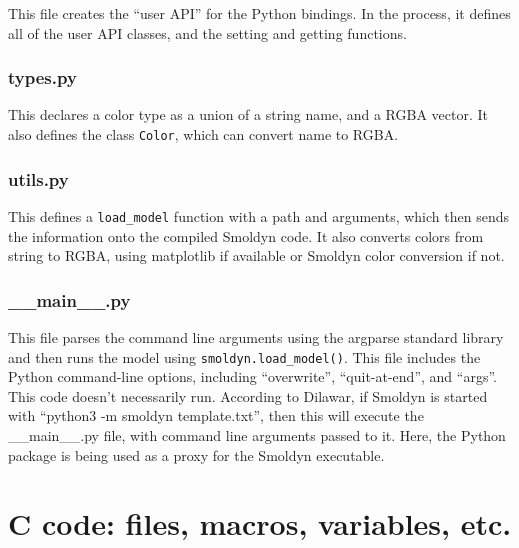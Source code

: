 \documentclass {scrbook}
\newcommand {\ttt} {\texttt}
\begin{document}
This file creates the ``user API'' for the Python bindings. In the process, it defines all of the user API classes, and the setting and getting functions.

\subsection*{types.py}

This declares a color type as a union of a string name, and a RGBA vector. It also defines the class \ttt{Color}, which can convert name to RGBA.

\subsection*{utils.py}

This defines a \ttt{load\_model} function with a path and arguments, which then sends the information onto the compiled Smoldyn code. It also converts colors from string to RGBA, using matplotlib if available or Smoldyn color conversion if not.

\subsection*{\_\_main\_\_.py}

This file parses the command line arguments using the argparse standard library and then runs the model using \ttt{smoldyn.load\_model()}. This file includes the Python command-line options, including ``overwrite'', ``quit-at-end'', and ``args''. This code doesn't necessarily run. According to Dilawar, if Smoldyn is started with ``python3 -m smoldyn template.txt'', then this will execute the \_\_main\_\_.py file, with command line arguments passed to it. Here, the Python package is being used as a proxy for the Smoldyn executable.


\chapter{C code: files, macros, variables, etc.}
\end{document}
